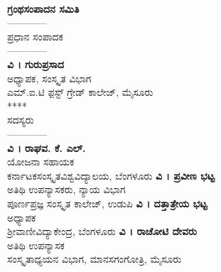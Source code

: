 \thispagestyle{empty}
~
\vfill
\noindent
\begin{center}
\fboxsep=20pt
{}
\end{center}
\vfill
\eject
\thispagestyle{empty}
\begin{center}

{\huge\bfseries ಗ್ರಂಥಸಂಪಾದನ ಸಮಿತಿ}\\
––––––––\\
\vfill
{\large ಪ್ರಧಾನ ಸಂಪಾದಕ}\\
––––––––\\
{\Large\bfseries ವಿ । ಗುರುಪ್ರಸಾದ}\\
ಅಧ್ಯಾಪಕ, ಸಂಸ್ಕೃತ ವಿಭಾಗ\\
ಎಮ್.ಐ.ಟಿ ಫ಼ಸ್ಟ್ ಗ್ರೇಡ್ ಕಾಲೇಜ್, ಮೈಸೂರು  \\
****\\
\vfill
{\large ಸದಸ್ಯರು}\\
––––––––\\
{\Large\bfseries ವಿ । ರಾಘವ. ಕೆ. ಎಲ್.}\\
ಯೋಜನಾ ಸಹಾಯಕ\\
ಕರ್ನಾಟಕಸಂಸ್ಕೃತವಿಶ್ವವಿದ್ಯಾಲಯ, ಬೆಂಗಳೂರು
\vfill
{\Large\bfseries ವಿ । ಪ್ರವೀಣ ಭಟ್ಟ}\\
ಅತಿಥಿ ಉಪನ್ಯಾಸಕರು, ನ್ಯಾಯ ವಿಭಾಗ\\
ಪೂರ್ಣಪ್ರಜ್ಞ ಸಂಸ್ಕೃತ ಕಾಲೇಜ್, ಉಡುಪಿ
\vfill
{\Large\bfseries ವಿ । ದತ್ತಾತ್ರೇಯ ಭಟ್ಟ}\\
ಅಧ್ಯಾಪಕ\\
ಶ್ರೀವಾಣೀವಿದ್ಯಾಕೇಂದ್ರ, ಬೆಂಗಳೂರು
\vfill
{\Large\bfseries ವಿ । ರಾಚೋಟಿ ದೇವರು}\\
ಅತಿಥಿ ಉಪನ್ಯಾಸಕ\\
ಸಂಸ್ಕೃತಾಧ್ಯಯನ ವಿಭಾಗ, ಮಾನಸಗಂಗೋತ್ರಿ, ಮೈಸೂರು

\end{center}
